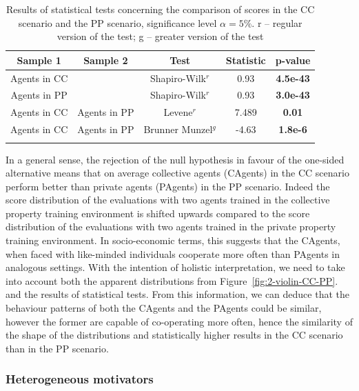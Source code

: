 \documentclass[pdflatex,sn-basic,lineno]{sn-jnl}
\theoremstyle{thmstyleone}%
\theoremstyle{thmstyletwo}%
\theoremstyle{thmstylethree}%
\begin{document}
\begin{table}[h!]
\caption{Results of statistical tests concerning the comparison of scores in the CC scenario and the PP scenario,
significance level $\alpha=5\%$. r -- regular version of the test; g -- greater version of the
test}\label{table:score-homo}%
\begin{tabular*}{\textwidth}{@{\extracolsep\fill}ccccc}
\toprule
Sample 1      & Sample 2      & Test                        & Statistic & p-value   \\ \midrule
Agents in CC &               & Shapiro-Wilk$^{r}$            & 0.93      & \textbf{4.5e-43}   \\
Agents in PP &               & Shapiro-Wilk$^{r}$            & 0.93      & \textbf{3.0e-43}   \\
Agents in CC & Agents in PP & Levene$^{r}$                   & 7.489     & \textbf{0.01}       \\
Agents in CC & Agents in PP & Brunner Munzel$^{g}$          & -4.63     & \textbf{1.8e-6}   \\ \botrule
\end{tabular*}


\end{table}


In a general sense, the rejection of the null hypothesis in favour of the one-sided alternative means that on average
collective agents (CAgents) in the CC scenario perform better than private agents (PAgents) in the PP scenario. Indeed
the score distribution of the evaluations with two agents trained in the collective property training environment is
shifted upwards compared to the score distribution of the evaluations with two agents trained in the private property
training environment. In socio-economic terms, this suggests that the CAgents, when faced with like-minded individuals
cooperate more often than PAgents in analogous settings. With the intention of holistic interpretation, we need to take
into account both the apparent distributions from Figure~\ref{fig:2-violin-CC-PP}. and the results of statistical tests.
From this information, we can deduce that the behaviour patterns of both the CAgents and the PAgents could be similar,
however the former are capable of co-operating more often, hence the similarity of the shape of the distributions and
statistically higher results in the CC scenario than in the PP scenario.

\subsubsection{Heterogeneous motivators}\label{subsubsec4-3-2}
\end{document}
